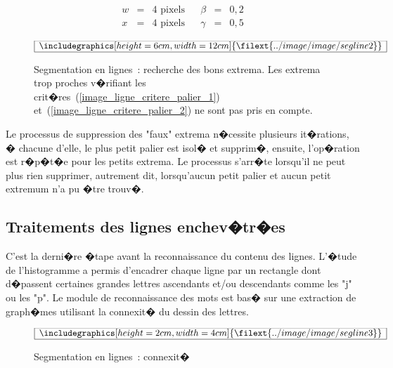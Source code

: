             $$
            \begin{array}{ccccccc}
            w &=& 4  \text{ pixels}     &&    \beta     &=& 0,2 \\
            x &=& 4  \text{ pixels}      &&    \gamma     &=& 0,5 
            \end{array}
            $$



            \begin{figure}[t]
        $$\frame{$\begin{array}[c]{c}\includegraphics[height=6cm, width=12cm]
        {\filext{../image/image/segline2}}\end{array}$}$$
        \caption{    Segmentation en lignes~: recherche des bons extrema. Les extrema trop proches v�rifiant les
                            crit�res~(\ref{image_ligne_critere_palier_1}) et~(\ref{image_ligne_critere_palier_2})
                            ne sont pas pris en compte.}
        \label{image_segline_extrema}
            \end{figure}



Le processus de suppression des "faux" extrema n�cessite plusieurs it�rations, � chacune d'elle, le plus petit palier est isol� et supprim�, ensuite, l'op�ration est r�p�t�e pour les petits extrema. Le processus s'arr�te lorsqu'il ne peut plus rien supprimer, autrement dit, lorsqu'aucun petit palier et aucun petit extremum n'a pu �tre trouv�.





\subsection{Traitements des lignes enchev�tr�es}




C'est la derni�re �tape avant la reconnaissance du contenu des lignes. L'�tude de l'histogramme a permis d'encadrer chaque ligne par un rectangle dont d�passent certaines grandes lettres ascendants et/ou descendants comme les "j" ou les "p". Le module de reconnaissance des mots est bas� sur une extraction de graph�mes utilisant la connexit� du dessin des lettres.


            \begin{figure}[ht]
        $$\frame{$\begin{array}[c]{c}\includegraphics[height=2cm, width=4cm]
        {\filext{../image/image/segline3}}\end{array}$}$$
        \caption{Segmentation en lignes~: connexit�}
        \label{image_segline_connex}
            \end{figure}



